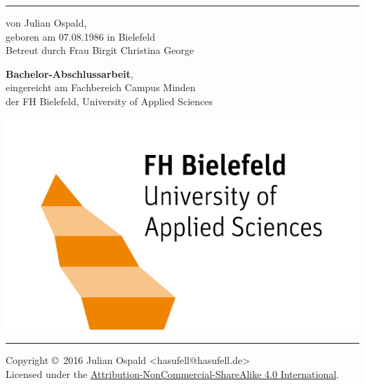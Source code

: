 \begin{titlepage}
    \hrule
	\vspace*{3cm}
	\begin{center}
		{\Huge \sc \TitleFirstLine}

		\begin{Large}
			\vspace*{18pt}
			{\Large von Julian Ospald,\\
			geboren am 07.08.1986 in Bielefeld\\
			Betreut durch Frau Birgit Christina George}

			\vspace*{40pt}
			{\bf Bachelor-Abschlussarbeit},\\
			eingereicht am Fachbereich Campus Minden\\
			der FH Bielefeld, University of Applied Sciences\\
			
			\vspace*{20pt}
			\noindent{\today}
		\end{Large}
		
		\vspace*{40pt}
		\includegraphics[scale=1.0]{Content/TitlePage/fhbi_logo_kompakt_orange}\\


	\vfill
    \hrule
   	\vfill

    
    		Copyright \copyright \ 2016 Julian Ospald <hasufell@hasufell.de>\\
Licensed under the \href{https://creativecommons.org/licenses/by-nc-sa/4.0/legalcode}{Attribution-NonCommercial-ShareAlike 4.0 International}.
	\end{center}
\end{titlepage}